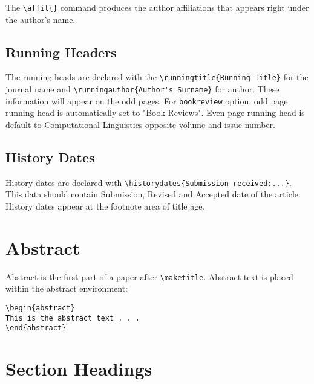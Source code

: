 \documentclass{clv3}
\begin{document}
The \verb|\affil{}| command produces the author affiliations that appears right under
the author's name.

\subsection{Running Headers}
The running heads are declared with the \verb|\runningtitle{Running Title}| for the
journal name and \verb|\runningauthor{Author's Surname}| for author. These information
will appear on the odd pages. For {\tt bookreview} option, odd page running head is
automatically set to "Book Reviews". Even page running head is default to Computational
Linguistics opposite volume and issue number.

\subsection{History Dates}

History dates are declared with \verb|\historydates{Submission received:...}|. This data
should contain Submission, Revised and Accepted date of the article. History dates appear
at the footnote area of title age.


\section{Abstract}

Abstract is the first part of a paper after \verb|\maketitle|. Abstract text is
placed within the abstract environment:

\begin{verbatim}
\begin{abstract}
This is the abstract text . . .
\end{abstract}
\end{verbatim}

\section{Section Headings}
\end{document}
